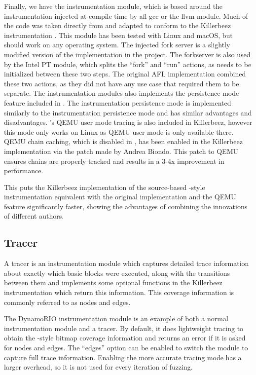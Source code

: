 Finally, we have the \AFL{} instrumentation module, which is based around the
instrumentation injected at compile time by afl-gcc or the \AFL{}
llvm module. Much of the code was taken directly from \AFL{} and adapted to
conform to the Killerbeez instrumentation \API{}. This module has been tested
with Linux and macOS, but should work on any \POSIX{} operating system.
The injected fork server is a slightly modified version of the
implementation in the \AFL{} project. The forkserver is also used by the
Intel PT module, which splits the ``fork'' and ``run'' actions, as \IPT{} needs
to be initialized between these two steps.  The original AFL implementation
combined these two actions, as they did not have any use case that required
them to be separate.  The \AFL{} instrumentation modules also
implements the persistence mode feature
included in \AFL{}.  The \AFL{} instrumentation persistence mode is implemented
similarly to the \IPT{} instrumentation persistence mode and has similar
advantages and disadvantages. \AFL{}'s QEMU user mode tracing is also included in Killerbeez,
however this mode only works on Linux as QEMU user mode is only
available there.  QEMU chain caching, which is disabled in \AFL{},
has been enabled in the Killerbeez implementation via the patch made by Andrea Biondo.\cite{qemuspeedup} This patch
to QEMU ensures chains are properly tracked and results in a 3-4x improvement
in performance.

This puts the Killerbeez implementation of the source-based \AFL{}-style
instrumentation equivalent with the original implementation and the QEMU
feature significantly faster, showing the advantages of combining the
innovations of different authors.

\subsection{Tracer} \label{Tracer}
A tracer is an instrumentation module which captures detailed trace
information about exactly which basic blocks were executed, along with the
transitions between them and implements some optional functions in the Killerbeez instrumentation \API{}
which return this information.  This coverage information is commonly referred
to as nodes and edges.

The DynamoRIO instrumentation module is an example of both a normal
instrumentation module and a tracer. By default, it does lightweight tracing to
obtain the \AFL{}-style bitmap coverage information and returns an error if it
is asked for nodes and edges. The ``edges'' option can be enabled to
switch the module to capture full trace information.
Enabling the more accurate tracing mode has a larger overhead, so it is not
used for every iteration of fuzzing.

